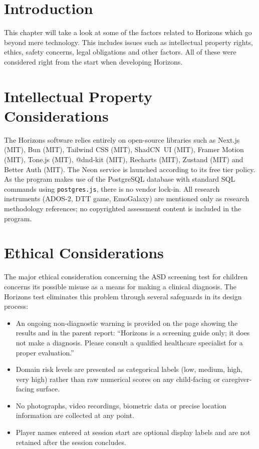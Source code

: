 \documentclass[12pt,a4paper,oneside]{report}
\begin{document}
\section{Introduction}

This chapter will take a look at some of the factors related to Horizons which go beyond mere technology. This includes issues such as intellectual property rights, ethics, safety concerns, legal obligations and other factors. All of these were considered right from the start when developing Horizons.

\section{Intellectual Property Considerations}

The Horizons software relies entirely on open-source libraries such as Next.js (MIT), Bun (MIT), Tailwind CSS (MIT), ShadCN~UI (MIT), Framer Motion (MIT), Tone.js (MIT), @dnd-kit (MIT), Recharts (MIT), Zustand (MIT) and Better Auth (MIT). The Neon service is launched according to its free tier policy. As the program makes use of the PostgreSQL database with standard SQL commands using \texttt{postgres.js}, there is no vendor lock-in. All research instruments (ADOS-2, DTT game, EmoGalaxy) are mentioned only as research methodology references; no copyrighted assessment content is included in the program.

\newpage

\section{Ethical Considerations}

The major ethical consideration concerning the ASD screening test for children concerns its possible misuse as a means for making a clinical diagnosis. The Horizons test eliminates this problem through several safeguards in its design process:

\begin{itemize}[leftmargin=0.5in]
  \item An ongoing non-diagnostic warning is provided on the page showing the results and in the parent report: “Horizons is a screening guide only; it does not make a diagnosis. Please consult a qualified healthcare specialist for a proper evaluation.''
  \item Domain risk levels are presented as categorical labels (low, medium, high, very high) rather than raw numerical scores on any child-facing or caregiver-facing surface.
  \item No photographs, video recordings, biometric data or precise location information are collected at any point.
  \item Player names entered at session start are optional display labels and are not retained after the session concludes.
\end{itemize}
\end{document}
